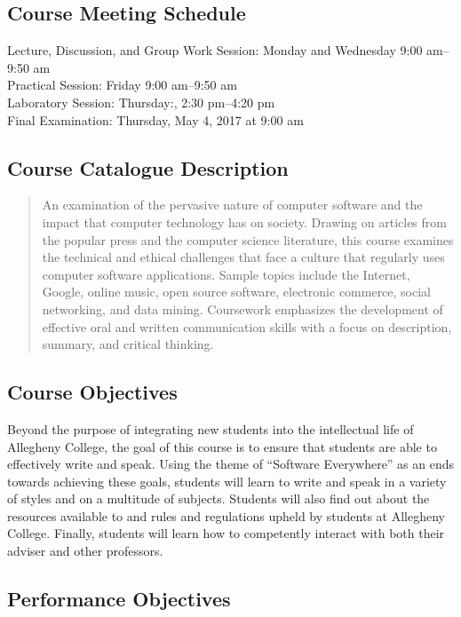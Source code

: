 \subsection*{Course Meeting Schedule}

Lecture, Discussion, and Group Work Session: Monday and Wednesday 9:00 am--9:50 am \\
Practical Session: Friday 9:00 am--9:50 am \\
Laboratory Session: Thursday:, 2:30 pm--4:20 pm \\
Final Examination: Thursday, May 4, 2017 at 9:00 am

\subsection*{Course Catalogue Description}

\begin{quote}

An examination of the pervasive nature of computer software and the impact that computer technology has on society.
Drawing on articles from the popular press and the computer science literature, this course examines the technical and
ethical challenges that face a culture that regularly uses computer software applications. Sample topics include the
Internet, Google, online music, open source software, electronic commerce, social networking, and data mining.
Coursework emphasizes the development of effective oral and written communication skills with a focus on description,
summary, and critical thinking.

\end{quote}

\subsection*{Course Objectives}

Beyond the purpose of integrating new students into the intellectual life of Allegheny College, the goal of this course
is to ensure that students are able to effectively write and speak.  Using the theme of ``Software Everywhere'' as an
ends towards achieving these goals, students will learn to write and speak in a variety of styles and on a multitude of
subjects.  Students will also find out about the resources available to and rules and regulations upheld by students at
Allegheny College.  Finally, students will learn how to competently interact with both their adviser and other
professors.

\subsection*{Performance Objectives}


